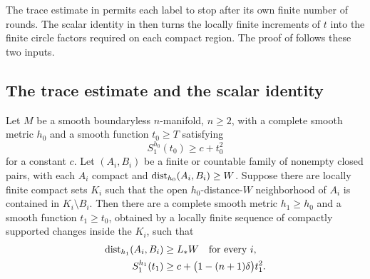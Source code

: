 The trace estimate in  permits each label to stop
after its own finite number of rounds. The scalar identity in
 then turns the locally finite increments of \(t\) into the finite circle factors required on each compact
region. The proof of  follows these two inputs.

\subsection{The trace estimate and the scalar identity}

\begin{lemma}\label{rounds:round}
Let \(M\) be a smooth boundaryless \(n\)-manifold, \(n\ge2\),
with a complete smooth metric \(h_0\) and a smooth function
\(t_0\ge T\) satisfying
\[
 S^{h_0}_1(t_0)\ge c+t_0^2
\]
for a constant \(c\). Let \((A_i,B_i)\) be a finite or countable family of
nonempty closed pairs, with each \(A_i\) compact and
\(\operatorname{dist}_{h_0}(A_i,B_i)\ge W\). Suppose there are locally finite compact
sets \(K_i\) such that the open \(h_0\)-distance-\(W\) neighborhood of
\(A_i\) is contained in \(K_i\setminus B_i\).
Then there are a complete smooth metric \(h_1\ge h_0\) and a smooth
function \(t_1\ge t_0\), obtained by a
locally finite sequence of compactly supported changes inside the
\(K_i\), such that
\begin{align}
 \operatorname{dist}_{h_1}(A_i,B_i)&\ge L_*W \quad\text{for every }i,\label{rounds:separation}\\
 S^{h_1}_1(t_1)&\ge c+
 \bigl(1-(n+1)\delta\bigr)t_1^2.\label{rounds:curvature}
\end{align}

\end{lemma}

